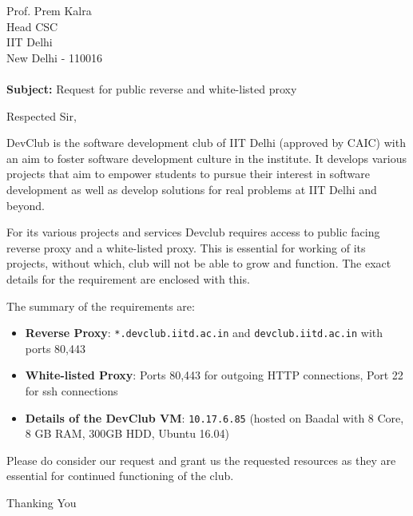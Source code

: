\documentclass[11pt,a4paper]{letter}
\begin{document}
\begin{letter}{Prof. Prem Kalra \\ Head CSC\\ IIT Delhi\\ New Delhi - 110016\\~\\%
        \textbf{Subject:} Request for public reverse and white-listed proxy}
    \vspace*{-10\baselineskip}%

    \opening{Respected Sir,}

    DevClub is the software development club of IIT Delhi (approved by CAIC) with an aim to foster software development culture in the institute. It develops various projects that aim to empower students to pursue their interest in software development as well as develop solutions for real problems at IIT Delhi and beyond.


    For its various projects and services Devclub requires access to public facing reverse proxy and a white-listed proxy. This is essential for working of its projects, without which, club will not be able to grow and function. The exact details for the requirement are enclosed with this.

    The summary of the requirements are:
    \begin{itemize}
        \item \textbf{Reverse Proxy}: \texttt{*.devclub.iitd.ac.in} and \texttt{devclub.iitd.ac.in} with ports 80,443
        \item \textbf{White-listed Proxy}: Ports 80,443 for outgoing HTTP connections, Port 22 for ssh connections
        \item \textbf{Details of the DevClub VM}: \texttt{10.17.6.85} (hosted on Baadal with 8 Core, 8 GB RAM, 300GB HDD, Ubuntu 16.04)
    \end{itemize}

    Please do consider our request and grant us the requested resources as they are essential for continued functioning of the club.

    \closing{Thanking You}
\end{letter}
\end{document}
